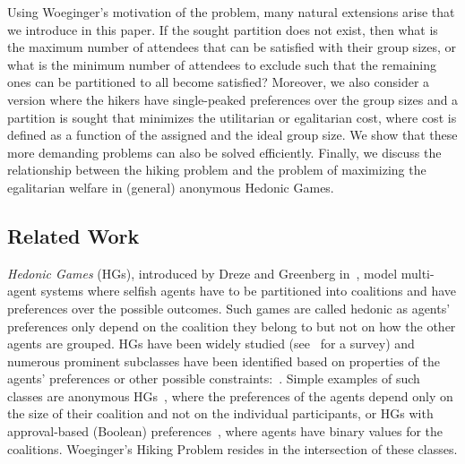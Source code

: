 \documentclass[a4paper]{article}
\begin{document}
Using Woeginger's motivation of the problem, many natural extensions arise that we introduce in this paper.
%
If the sought partition does not exist, then what is the maximum number of attendees that can be satisfied with their group sizes, or what is the minimum number of attendees to exclude such that the remaining ones can be partitioned to all become satisfied? 
Moreover, we also consider a version where the hikers have single-peaked preferences over the group sizes and a partition is sought that minimizes the utilitarian or egalitarian cost, where cost is defined as a function of the assigned and the ideal group size.
We show that these more demanding problems can also be solved efficiently.
Finally, we discuss the relationship between the hiking problem and the problem of maximizing the egalitarian welfare in (general) anonymous Hedonic Games.


\subsection{Related Work}

\emph{Hedonic Games} (HGs), introduced by Dreze and Greenberg in~\cite{dreze1980hedonic}, model multi-agent systems where selfish agents have to be partitioned into coalitions and have preferences over the possible outcomes. Such games are called hedonic as agents’ preferences only depend on the coalition they belong to but not on how the other agents are grouped. 
HGs have been widely studied (see~\cite{aziz2016hedonic} for a survey) and numerous prominent subclasses have been identified based on properties of the agents' preferences or other possible constraints:~\cite{ballester2004np,bogomolnaia2002stability,alcalde2004researching,olsen2009nash,Elkind09, aziz2019fractional}. 
Simple examples of such classes are anonymous HGs~\cite{banerjee2001core}, where the preferences of the agents depend only on the size of their coalition and not on the individual participants, or HGs with approval-based (Boolean) preferences~\cite{aziz2016boolean}, where agents have binary values for the coalitions. Woeginger’s Hiking Problem resides in the intersection of these classes.
\end{document}
